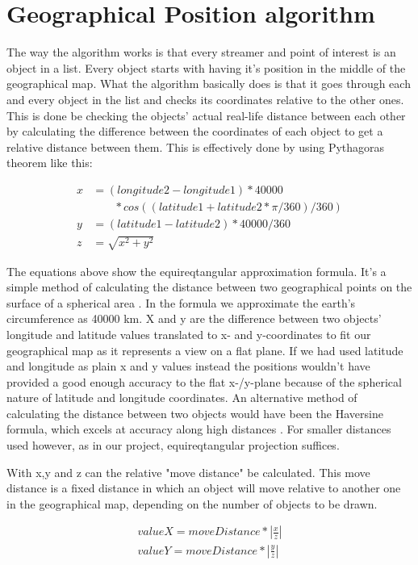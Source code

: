 \section{Geographical Position algorithm}
\label{sec:geoalgorithm}

The way the algorithm works is that every streamer and point of interest is an object in a list. Every object starts with having it's position in the middle of the geographical map. What the algorithm basically does is that it goes through each and every object in the list and checks its coordinates relative to the other ones. This is done be checking the objects' actual real-life distance between each other by calculating the difference between the coordinates of each object to get a relative distance between them. This is effectively done by using Pythagoras theorem like this:

\begin{align*}
x &= (longitude2-longitude1)*40000  \\
 &\phantom{b=\,} *cos((latitude1+latitude2 * \pi/360)/360) \nonumber \\
y &= (latitude1-latitude2)*40000/360 \\
z &= \sqrt{x^2+y^2}
\end{align*}

The equations above show the equireqtangular approximation formula. It's a simple method of calculating the distance between two geographical points on the surface of a spherical area \cite[s.~5]{equi}. In the formula we approximate the earth's circumference as 40000 km. X and y are the difference between two objects' longitude and latitude values translated to x- and y-coordinates to fit our geographical map as it represents a view on a flat plane. If we had used latitude and longitude as plain x and y values instead the positions wouldn't have provided a good enough accuracy to the flat x-/y-plane because of the spherical nature of latitude and longitude coordinates. An alternative method of calculating the distance between two objects would have been the Haversine formula, which excels at accuracy along high distances \cite{haversine}. For smaller distances used however, as in our project, equireqtangular projection suffices.

With x,y and z can the relative "move distance" be calculated. This move distance is a fixed distance in which an object will move relative to another one in the geographical map, depending on the number of objects to be drawn.

\begin{align*}
\label{eq:2}
valueX = moveDistance*|\frac{x}{z}| \\
valueY = moveDistance*|\frac{y}{z}|
\end{align*}


